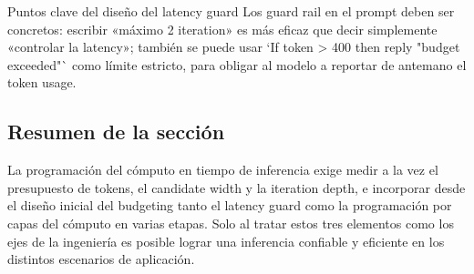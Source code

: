 \begin{warningbox}{Puntos clave del diseño del latency guard}
Los guard rail en el prompt deben ser concretos: escribir «máximo 2 iteration» es más eficaz que decir simplemente «controlar la latency»; también se puede usar `If token > 400 then reply "budget exceeded"` como límite estricto, para obligar al modelo a reportar de antemano el token usage.
\end{warningbox}

\subsection{Resumen de la sección}
La programación del cómputo en tiempo de inferencia exige medir a la vez el presupuesto de tokens, el candidate width y la iteration depth, e incorporar desde el diseño inicial del budgeting tanto el latency guard como la programación por capas del cómputo en varias etapas. Solo al tratar estos tres elementos como los ejes de la ingeniería es posible lograr una inferencia confiable y eficiente en los distintos escenarios de aplicación.
